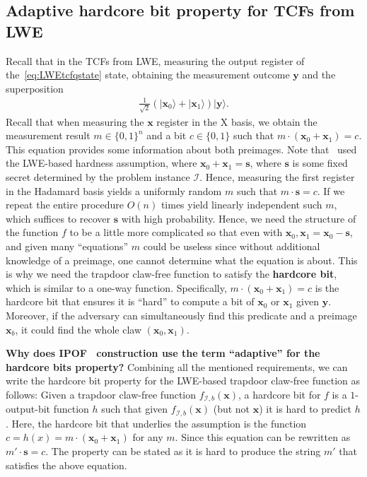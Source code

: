 \subsection{Adaptive hardcore bit property for TCFs from LWE}

Recall that in the TCFs from LWE, measuring the output register of the~\eqref{eq:LWEtcfqstate} state, obtaining the measurement outcome $\mathbf{y}$ and the superposition
\begin{align}
    \frac{1}{\sqrt{2}}(|\mathbf{x}_0\rangle +|\mathbf{x}_1\rangle)|\mathbf{y}\rangle.\label{eq:lwetfcstate}
\end{align}
\noindent Recall that when measuring the $\mathbf{x}$ register in the X basis, we obtain the measurement result $m\in\{0,1\}^n$ and a bit $c\in\{0,1\}$ such that $m\cdot(\mathbf{x}_0+\mathbf{x}_1) = c$. This equation provides some information about both preimages. Note that~\cite{Brakerski18_Interactiveproofofquantumness} used the LWE-based hardness assumption, where $\mathbf{x}_0 + \mathbf{x}_1 = \mathbf{s}$, where $\mathbf{s}$ is some fixed secret determined by the problem instance $\mathcal{I}$. Hence, measuring the first register in the Hadamard basis yields a uniformly random $m$ such that $m\cdot \mathbf{s} = c$. If we repeat the entire procedure $O(n)$ times yield linearly independent such $m$, which suffices to recover $\mathbf{s}$ with high probability. Hence, we need the structure of the function $f$ to be a little more complicated so that even with $\mathbf{x}_0, \mathbf{x}_1 =\mathbf{x}_0- \mathbf{s}$, and given many ``equations'' $m$ could be useless since without additional knowledge of a preimage, one cannot determine what the equation is about. This is why we need the trapdoor claw-free function to satisfy the \textbf{hardcore bit}, which is similar to a one-way function. Specifically, $m\cdot(\mathbf{x}_0+\mathbf{x}_1) = c$ is the hardcore bit that ensures it is ``hard'' to compute a bit of $\mathbf{x}_0$ or $\mathbf{x}_1$ given $\mathbf{y}$. Moreover, if the adversary can simultaneously find this predicate and a preimage $\mathbf{x}_b$, it could find the whole claw $(\mathbf{x}_0, \mathbf{x}_1)$.



\noindent\textbf{Why does IPOF~\cite{Brakerski18_Interactiveproofofquantumness} construction use the term ``adaptive'' for the hardcore bits property?}
Combining all the mentioned requirements, we can write the hardcore bit property for the LWE-based trapdoor claw-free function as follows:
Given a trapdoor claw-free function $f_{\mathcal{I},b}(\mathbf{x})$, a hardcore bit for $f$ is a $1$-output-bit function $h$ such that given  $f_{\mathcal{I},b}(\mathbf{x})$ (but not $\mathbf{x}$) it is hard to predict $h$. Here, the hardcore bit that underlies the assumption is the function $c = h(x)= m\cdot (\mathbf{x}_0 + \mathbf{x}_1)$ for any $m$.
Since this equation can be rewritten as $m'\cdot \mathbf{s} =c$. The property can be stated as it is hard to produce the string $m'$ that satisfies the above equation.

